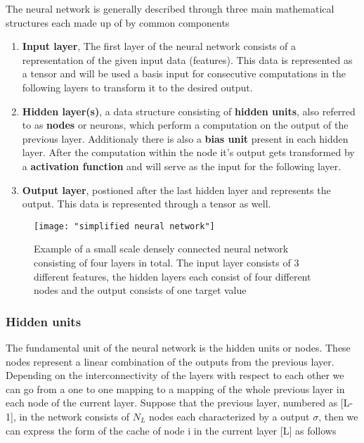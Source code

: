\documentclass[12pt]{article}
\begin{document}
The neural network is generally described through three main mathematical structures each made up of by common components\cite{Bishop2013}\cite{Haykin2008}\cite{Budumu}\cite{P.Murphy1991}\cite{TrevorHastie2009}
\begin{enumerate}
	\item \textbf{Input layer}, The first layer of the neural network consists of a representation of the given input data (features). This data is represented as a tensor and will be used a basis input for consecutive computations in the following layers to transform it to the desired output.
	\item \textbf{Hidden layer(s)}, a data structure consisting of \textbf{hidden units}, also referred to as \textbf{nodes} or neurons, which perform a computation on the output of the previous layer. Additionaly there is also a \textbf{bias unit} present in each hidden layer. After the computation within the node it's output gets transformed by a \textbf{activation function} and will serve as the input for the following layer.
	\item \textbf{Output layer}, postioned after the last hidden layer and represents the output. This data is represented through a tensor as well.
\end{enumerate}
\begin{figure}[h]
	\centering
	\texttt{[image: "simplified neural network"]}
	\caption{Example of a small scale densely connected neural network consisting of four layers in total. The input layer consists of 3 different features, the hidden layers each consist of four different nodes and the output consists of one target value}
	\label{fig:structure}
\end{figure}

\subsubsection{Hidden units}

The fundamental unit of the neural network is the hidden units or nodes. These nodes represent a linear combination of the outputs from the previous layer. Depending on the interconnectivity of the layers with respect to each other we can go from a one to one mapping to a mapping of the whole previous layer in each node of the current layer. Suppose that the previous layer, numbered as [L-1], in the network consists of $N_L$ nodes each characterized by a output $\sigma$, then we can express the form of the cache of node i in the current layer [L] as follows\cite{Bishop2013}\cite{GoodfellowIan;BengioYoshua;Couville2016} 
\end{document}
